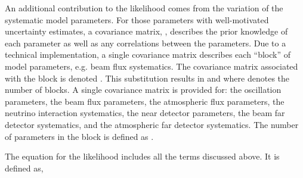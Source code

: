 An additional contribution to the likelihood comes from the variation of the systematic model parameters. For those parameters with well-motivated uncertainty estimates, a covariance matrix, , describes the prior knowledge of each parameter as well as any correlations between the parameters. Due to a technical implementation, a single covariance matrix describes each ``block'' of model parameters, e.g. beam flux systematics. The covariance matrix associated with the  block is denoted . This substitution results in  and  where  denotes the number of blocks. A single covariance matrix is provided for: the oscillation parameters, the beam flux parameters, the atmospheric flux parameters, the neutrino interaction systematics, the near detector parameters, the beam far detector systematics, and the atmospheric far detector systematics. The number of parameters in the  block is defined as .

The equation for the likelihood  includes all the terms discussed above. It is defined as,

